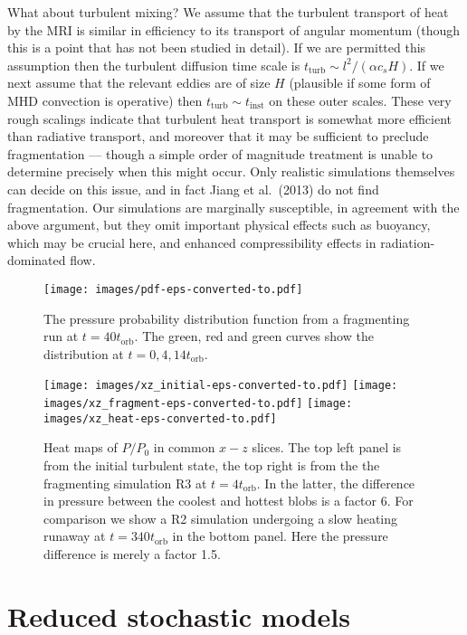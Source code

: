 \documentclass[useAMS]{mn2e}
\begin{document}
What about turbulent mixing?
We assume that the turbulent transport of heat by the MRI is similar
in efficiency to its transport of angular momentum (though this is a
point that has not been studied in detail). If we are permitted this
assumption then the turbulent diffusion time scale is
$t_{\text{turb}}\sim l^{2}/(\alpha  c_{s}H)$. If we next assume that the relevant eddies are of size $H$ 
(plausible if some form of MHD convection is operative)
then $t_{\text{turb}}\sim t_{\text{inst}}$ on these outer scales. These very rough
scalings indicate that turbulent heat transport is somewhat more
efficient than radiative transport, and moreover that it may be
sufficient to preclude fragmentation --- though a simple order of
magnitude treatment is unable to determine precisely when this might
occur. Only realistic simulations themselves can decide on this issue,
and in fact Jiang et al.~(2013) do not find fragmentation. Our
simulations
are marginally susceptible, in agreement with the above argument, but
they omit important physical effects such as buoyancy, which
may be crucial here, and enhanced compressibility effects in
radiation-dominated flow.


\begin{figure}
\texttt{[image: images/pdf-eps-converted-to.pdf]}
\caption{The pressure probability distribution function from a
  fragmenting run at $t=40t_{\text{orb}}$. The green, red and green curves show the distribution at $t=0,4,14t_{\text{orb}}$.}
\label{fig::UN_pdf_P_f}
\end{figure}



\begin{figure*}
\texttt{[image: images/xz\_initial-eps-converted-to.pdf]}
\texttt{[image: images/xz\_fragment-eps-converted-to.pdf]}
\texttt{[image: images/xz\_heat-eps-converted-to.pdf]}
\caption{Heat maps of $P/P_{0}$ in common $x-z$ slices. 
The top left panel is from the initial turbulent state, the top right
is from the 
the fragmenting simulation R3 at $t=4t_{\text{orb}}$. In the latter,
the difference in pressure between the coolest and hottest blobs is a factor 6.
For comparison we show a R2 simulation undergoing a slow heating
runaway at $t=340t_{\text{orb}}$ in the bottom panel. Here the
pressure difference is merely a factor 1.5. }
\label{fig::UN_snaP}
\end{figure*}



\section{Reduced stochastic models}
\end{document}
